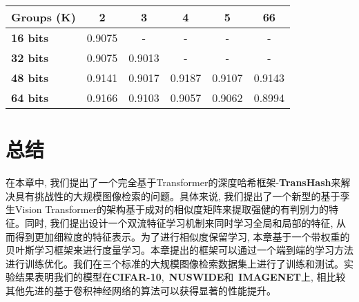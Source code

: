 \begin{table}[!htpb]
    \centering
    \begin{tabular}{ccccccc}
       \\ \hline
    
    \multicolumn{2}{l|}{Groups (K)} & 2 & 3 & 4 & 5  & 66 \\\hline
    \hline
    \multicolumn{2}{l|}{\textbf{16 bits}} & 0.9075 & - & - & - & -  \\
    \multicolumn{2}{l|}{\textbf{32 bits}} & 0.9075 & 0.9013 & - & - & -  \\
    \multicolumn{2}{l|}{\textbf{48 bits}} & 0.9141 & 0.9017 & 0.9187 & 0.9107 & 0.9143 \\
    \multicolumn{2}{l|}{\textbf{64 bits}} & 0.9166 & 0.9103 & 0.9057 & 0.9062 & 0.8994  \\
    \hline 
    \hline
    \end{tabular}
    \label{table:ablationk}
  \end{table}


\section{总结}
在本章中, 我们提出了一个完全基于Transformer的深度哈希框架-\textbf{TransHash}来解决具有挑战性的大规模图像检索的问题。具体来说, 我们提出了一个新型的基于孪生Vision Transformer的架构基于成对的相似度矩阵来提取强健的有判别力的特征。同时, 我们提出设计一个双流特征学习机制来同时学习全局和局部的特征, 从而得到更加细粒度的特征表示。为了进行相似度保留学习, 本章基于一个带权重的贝叶斯学习框架来进行度量学习。本章提出的框架可以通过一个端到端的学习方法进行训练优化。我们在三个标准的大规模图像检索数据集上进行了训练和测试。实验结果表明我们的模型在\textbf{CIFAR-10},~\textbf{NUSWIDE}和~\textbf{IMAGENET}上, 相比较其他先进的基于卷积神经网络的算法可以获得显著的性能提升。
